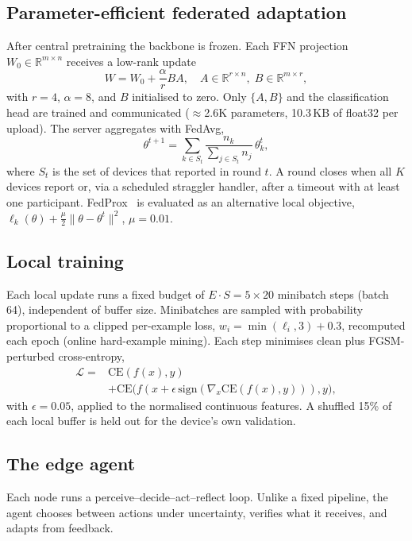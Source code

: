 \subsection{Parameter-efficient federated adaptation}
After central pretraining the backbone is frozen. Each FFN projection
$W_0\in\mathbb R^{m\times n}$ receives a low-rank update
\begin{equation}
W = W_0 + \frac{\alpha}{r} B A,\quad A\in\mathbb R^{r\times n},\; B\in\mathbb R^{m\times r},
\end{equation}
with $r{=}4$, $\alpha{=}8$, and $B$ initialised to zero. Only $\{A,B\}$ and
the classification head are trained and communicated
($\approx$2.6K parameters, 10.3\,KB of float32 per upload).
The server aggregates with FedAvg,
\begin{equation}
\theta^{t+1} = \sum_{k\in S_t} \frac{n_k}{\sum_{j\in S_t} n_j}\,\theta_k^{t},
\end{equation}
where $S_t$ is the set of devices that reported in round $t$. A round closes
when all $K$ devices report or, via a scheduled straggler handler, after a
timeout with at least one participant. FedProx~\cite{li2020fedprox} is evaluated as an
alternative local objective,
$\ell_k(\theta) + \frac{\mu}{2}\lVert\theta-\theta^{t}\rVert^2$, $\mu{=}0.01$.

\subsection{Local training}
Each local update runs a fixed budget of $E{\cdot}S = 5{\times}20$ minibatch
steps (batch 64), independent of buffer size. Minibatches are sampled with
probability proportional to a clipped per-example loss,
$w_i = \min(\ell_i, 3) + 0.3$, recomputed each epoch (online hard-example
mining). Each step minimises clean plus FGSM-perturbed cross-entropy,
\begin{equation}
\begin{aligned}
\mathcal L ={}& \mathrm{CE}(f(x),y)\\
&+ \mathrm{CE}\big(f(x+\epsilon\,\mathrm{sign}(\nabla_x \mathrm{CE}(f(x),y))),y\big),
\end{aligned}
\end{equation}
with $\epsilon{=}0.05$, applied to the normalised continuous features. A shuffled 15\% of each
local buffer is held out for the device's own validation.

\subsection{The edge agent}
Each node runs a perceive--decide--act--reflect loop. Unlike a fixed pipeline,
the agent chooses between actions under uncertainty, verifies what it
receives, and adapts from feedback.

